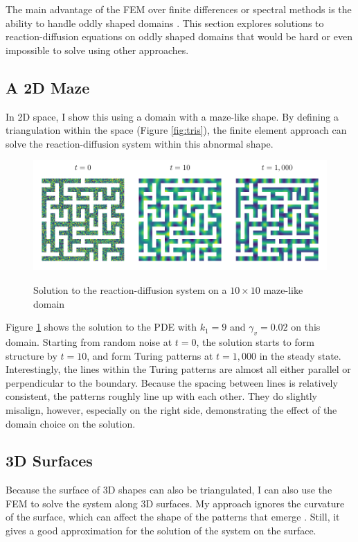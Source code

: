 The main advantage of the FEM over finite differences or spectral methods is the ability to handle oddly shaped domains \parencite{erhunmwun2017review}. This section explores solutions to reaction-diffusion equations on oddly shaped domains that would be hard or even impossible to solve using other approaches.

\subsection{A 2D Maze}

In 2D space, I show this using a domain with a maze-like shape. By defining a triangulation within the space (Figure \ref{fig:tris}), the finite element approach can solve the reaction-diffusion system within this abnormal shape.

\begin{figure}[t]
    \centering
    \caption{Solution to the reaction-diffusion system on a $10 \times 10$ maze-like domain}
    \includegraphics{figures/maze_ts.pdf}
    \label{fig:maze}
\end{figure}

Figure \ref{fig:maze} shows the solution to the PDE with $k_1 = 9$ and $\gamma_v = 0.02$ on this domain. Starting from random noise at $t = 0$, the solution starts to form structure by $t = 10$, and form Turing patterns at $t = 1,000$ in the steady state. Interestingly, the lines within the Turing patterns are almost all either parallel or perpendicular to the boundary. Because the spacing between lines is relatively consistent, the patterns roughly line up with each other. They do slightly misalign, however, especially on the right side, demonstrating the effect of the domain choice on the solution.


\subsection{3D Surfaces}

Because the surface of 3D shapes can also be triangulated, I can also use the FEM to solve the system along 3D surfaces. My approach ignores the curvature of the surface, which can affect the shape of the patterns that emerge \parencites{staddon2024zebra}{leon2021full}. Still, it gives a good approximation for the solution of the system on the surface.

